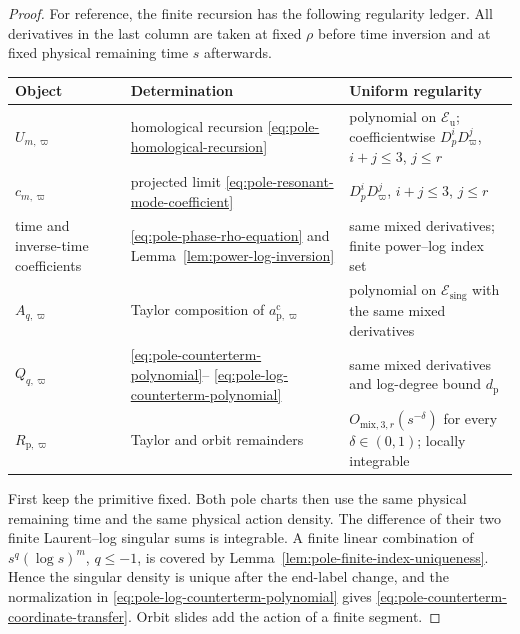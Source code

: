 \documentclass[11pt]{amsart}
\numberwithin{equation}{section}
\theoremstyle{definition}
\theoremstyle{remark}
\begin{document}
\begin{proof}
For reference, the finite recursion has the following regularity ledger.
All derivatives in the last column are taken at fixed $\rho$ before time
inversion and at fixed physical remaining time $s$ afterwards.
\begin{center}
\small
\begin{tabularx}{\textwidth}{@{}p{}p{}Y@{}}
\hline
Object & Determination & Uniform regularity \\
\hline
$U_{m,\varpi}$ &
homological recursion \eqref{eq:pole-homological-recursion} &
polynomial on $\mathcal E_{\mathrm u}$; coefficientwise
$D_p^iD_\varpi^j$, $i+j\le3$, $j\le r$ \\
$c_{m,\varpi}$ &
projected limit \eqref{eq:pole-resonant-mode-coefficient} &
$D_p^iD_\varpi^j$, $i+j\le3$, $j\le r$ \\
time and inverse-time coefficients &
\eqref{eq:pole-phase-rho-equation} and
Lemma~\ref{lem:power-log-inversion} &
same mixed derivatives; finite power--log index set \\
$A_{q,\varpi}$ &
Taylor composition of $a_{\mathrm p,\varpi}^{\mathrm c}$ &
polynomial on $\mathcal E_{\mathrm{sing}}$ with the same mixed derivatives \\
$Q_{q,\varpi}$ &
\eqref{eq:pole-counterterm-polynomial}--
\eqref{eq:pole-log-counterterm-polynomial} &
same mixed derivatives and log-degree bound $d_{\mathrm p}$ \\
$R_{\mathrm p,\varpi}$ &
Taylor and orbit remainders &
$O_{\mathrm{mix},3,r}(s^{-\delta})$ for every $\delta\in(0,1)$;
locally integrable \\
\hline
\end{tabularx}
\end{center}

First keep the primitive fixed.  Both pole charts then use the same
physical remaining time and the same physical action density.  The
difference of their two finite
Laurent--log singular sums is integrable.  A finite linear combination of
$s^q(\log s)^m$, $q\le-1$, is covered by
Lemma~\ref{lem:pole-finite-index-uniqueness}.  Hence the singular density
is unique after the end-label change,
and the normalization in \eqref{eq:pole-log-counterterm-polynomial} gives
\eqref{eq:pole-counterterm-coordinate-transfer}.  Orbit slides add the
action of a finite segment.


\end{proof}
\end{document}

